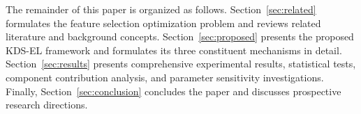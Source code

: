 The remainder of this paper is organized as follows. Section~\ref{sec:related} formulates the feature selection optimization problem and reviews related literature and background concepts. Section~\ref{sec:proposed} presents the proposed KDS-EL framework and formulates its three constituent mechanisms in detail. Section~\ref{sec:results} presents comprehensive experimental results, statistical tests, component contribution analysis, and parameter sensitivity investigations. Finally, Section~\ref{sec:conclusion} concludes the paper and discusses prospective research directions.

